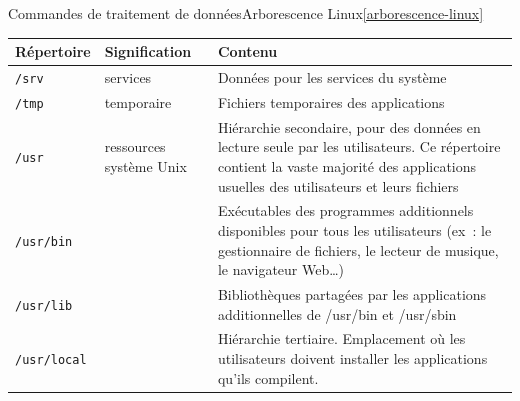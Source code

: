 \documentclass{beamer}
\begin{document}
    \begin{frame}{Commandes de traitement de données}{Arborescence Linux\cref{arborescence-linux}}
        \begin{tiny}
            \begin{table}[h!]
                \centering
                \begin{tabular}{|l|p{3cm}|p{6cm}|}
                    \hline
                    \textbf{Répertoire}    & \textbf{Signification}  & \textbf{Contenu}                                                                                                                                                                     \\
                    \hline
                    \lstinline{/srv}       & services                & Données pour les services du système                                                                                                                                                 \\
                    \hline
                    \lstinline{/tmp}       & temporaire              & Fichiers temporaires des applications                                                                                                                                                \\
                    \hline
                    \lstinline{/usr}       & ressources système Unix & Hiérarchie secondaire, pour des données en lecture seule par les utilisateurs. Ce répertoire contient la vaste majorité des applications usuelles des utilisateurs et leurs fichiers \\
                    \hline
                    \lstinline{/usr/bin}   &                         & Exécutables des programmes additionnels disponibles pour tous les utilisateurs (ex~: le gestionnaire de fichiers, le lecteur de musique, le navigateur Web…)                         \\
                    \hline
                    \lstinline{/usr/lib}   &                         & Bibliothèques partagées par les applications additionnelles de /usr/bin et /usr/sbin                                                                                                 \\
                    \hline
                    \lstinline{/usr/local} &                         & Hiérarchie tertiaire. Emplacement où les utilisateurs doivent installer les applications qu'ils compilent.                                                                           \\

\end{tabular}
\end{table}
\end{tiny}
\end{frame}
\end{document}
